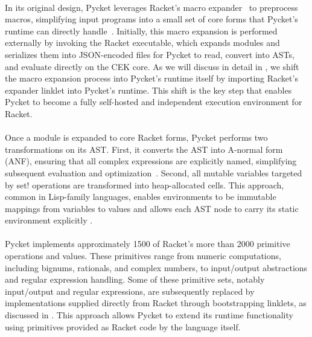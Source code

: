         \paragraph{}%
            In its original design, Pycket leverages Racket’s macro expander~\cite{flatt:2002} to preprocess macros, simplifying input programs into a small set of core forms that Pycket's runtime can directly handle~\cite{samth:11}. Initially, this macro expansion is performed externally by invoking the Racket executable, which expands modules and serializes them into JSON-encoded files for Pycket to read, convert into ASTs, and evaluate directly on the CEK core. As we will discuss in detail in , we shift the macro expansion process into Pycket's runtime itself by importing Racket's expander linklet into Pycket's runtime. This shift is the key step that enables Pycket to become a fully self-hosted and independent execution environment for Racket.

        \paragraph{}%
            Once a module is expanded to core Racket forms, Pycket performs two transformations on its AST. First, it converts the AST into A-normal form (ANF), ensuring that all complex expressions are explicitly named, simplifying subsequent evaluation and optimization~\cite{danvy:93,flanagan:93}. Second, all mutable variables targeted by set! operations are transformed into heap-allocated cells. This approach, common in Lisp-family languages, enables environments to be immutable mappings from variables to values and allows each AST node to carry its static environment explicitly \cite{pycketmain}.

        \paragraph{}%
            Pycket implements approximately 1500 of Racket’s more than 2000 primitive operations and values. These primitives range from numeric computations, including bignums, rationals, and complex numbers, to input/output abstractions and regular expression handling. Some of these primitive sets, notably input/output and regular expressions, are subsequently replaced by implementations supplied directly from Racket through bootstrapping linklets, as discussed in . This approach allows Pycket to extend its runtime functionality using primitives provided as Racket code by the language itself.

